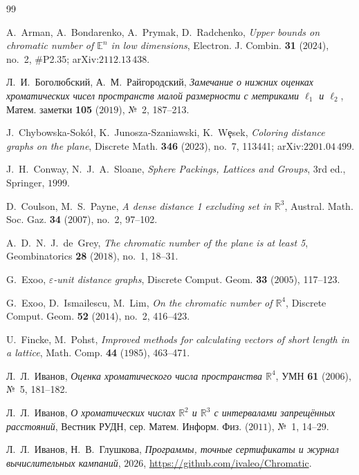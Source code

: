 \documentclass[11pt]{article}
\theoremstyle{definition}
\theoremstyle{remark}
\newcommand{\R}{\mathbb{R}}
\newcommand{\E}{\mathbb{E}}
\begin{document}
\begin{thebibliography}{99}\small

 A.~Arman, A.~Bondarenko, A.~Prymak, D.~Radchenko,
\emph{Upper bounds on chromatic number of $\E^n$ in low dimensions},
Electron. J. Combin. \textbf{31} ($2024$), no.~2, \#P2.35; arXiv:$2112$.$13\,438$.

 Л.~И.~Боголюбский, А.~М.~Райгородский,
\emph{Замечание о нижних оценках хроматических чисел пространств малой
размерности с метриками $\ell_1$ и $\ell_2$}, Матем. заметки \textbf{105}
($2019$), №~2, 187--213.

 J.~Chybowska-Sok\'o\l{}, K.~Junosza-Szaniawski, K.~W\c{e}sek,
\emph{Coloring distance graphs on the plane},
Discrete Math. \textbf{346} ($2023$), no.~7, 113441;
arXiv:$2201$.$04\,499$.

 J.~H.~Conway, N.~J.~A.~Sloane,
\emph{Sphere Packings, Lattices and Groups}, 3rd ed., Springer, $1999$.

 D.~Coulson, M.~S.~Payne,
\emph{A dense distance 1 excluding set in $\R^3$},
Austral. Math. Soc. Gaz. \textbf{34} ($2007$), no.~2, 97--102.

 A.~D.~N.~J.~de~Grey,
\emph{The chromatic number of the plane is at least 5},
Geombinatorics \textbf{28} ($2018$), no.~1, 18--31.

 G.~Exoo,
\emph{$\varepsilon$-unit distance graphs},
Discrete Comput. Geom. \textbf{33} ($2005$), 117--123.

 G.~Exoo, D.~Ismailescu, M.~Lim,
\emph{On the chromatic number of $\R^4$},
Discrete Comput. Geom. \textbf{52} ($2014$), no.~2, 416--423.

 U.~Fincke, M.~Pohst,
\emph{Improved methods for calculating vectors of short length in a lattice},
Math. Comp. \textbf{44} ($1985$), 463--471.

 Л.~Л.~Иванов,
\emph{Оценка хроматического числа пространства $\R^4$},
УМН \textbf{61} ($2006$), №~5, 181--182.

 Л.~Л.~Иванов,
\emph{О хроматических числах $\R^2$ и $\R^3$ с интервалами запрещённых
расстояний}, Вестник РУДН, сер. Матем. Информ. Физ. ($2011$), №~1, 14--29.

 Л.~Л.~Иванов, Н.~В.~Глушкова,
\emph{Программы, точные сертификаты и журнал вычислительных кампаний},
$2026$, \url{https://github.com/ivaleo/Chromatic}.


\end{thebibliography}
\end{document}
